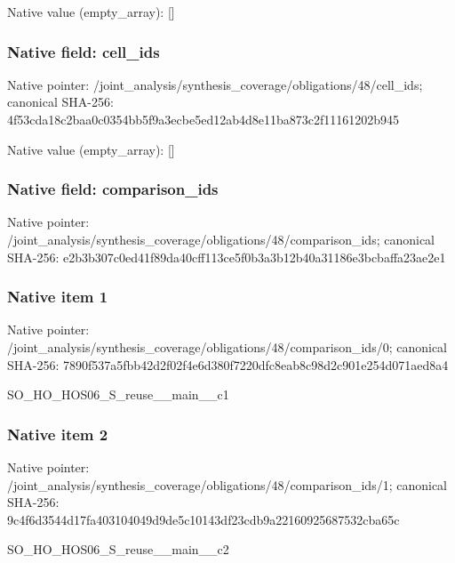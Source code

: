 \documentclass[10pt,a4paper]{article}
\begin{document}
Native value (empty\_\allowbreak{}array): []

\subsubsection{Native field: cell\_\allowbreak{}ids}
Native pointer: /joint\_\allowbreak{}analysis/synthesis\_\allowbreak{}coverage/obligations/48/cell\_\allowbreak{}ids; canonical SHA-256: 4f53cda18c2baa0c0354bb5f9a3ecbe5ed12ab4d8e11ba873c2f11161202b945

Native value (empty\_\allowbreak{}array): []

\subsubsection{Native field: comparison\_\allowbreak{}ids}
Native pointer: /joint\_\allowbreak{}analysis/synthesis\_\allowbreak{}coverage/obligations/48/comparison\_\allowbreak{}ids; canonical SHA-256: e2b3b307c0ed41f89da40cff113ce5f0b3a3b12b40a31186e3bcbaffa23ae2e1

\subsubsection{Native item 1}
Native pointer: /joint\_\allowbreak{}analysis/synthesis\_\allowbreak{}coverage/obligations/48/comparison\_\allowbreak{}ids/0; canonical SHA-256: 7890f537a5fbb42d2f02f4e6d380f7220dfc8eab8c98d2c901e254d071aed8a4

\begingroup\raggedright\sloppy SO\_\allowbreak{}HO\_\allowbreak{}HOS06\_\allowbreak{}S\_\allowbreak{}reuse\_\allowbreak{}\_\allowbreak{}main\_\allowbreak{}\_\allowbreak{}c1\par\endgroup

\subsubsection{Native item 2}
Native pointer: /joint\_\allowbreak{}analysis/synthesis\_\allowbreak{}coverage/obligations/48/comparison\_\allowbreak{}ids/1; canonical SHA-256: 9c4f6d3544d17fa403104049d9de5c10143df23cdb9a22160925687532cba65c

\begingroup\raggedright\sloppy SO\_\allowbreak{}HO\_\allowbreak{}HOS06\_\allowbreak{}S\_\allowbreak{}reuse\_\allowbreak{}\_\allowbreak{}main\_\allowbreak{}\_\allowbreak{}c2\par\endgroup
\end{document}
